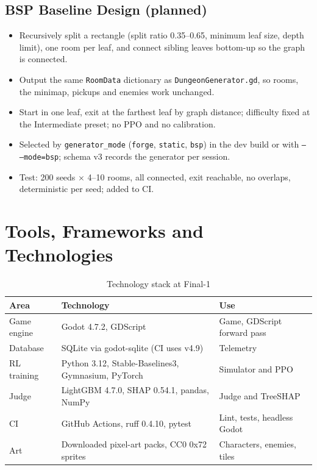 \subsection{BSP Baseline Design (planned)}
\label{sec:bsp_plan}
\begin{itemize}
    \item Recursively split a rectangle (split ratio 0.35--0.65, minimum leaf size, depth limit), one room per leaf, and connect sibling leaves bottom-up so the graph is connected.
    \item Output the same \texttt{RoomData} dictionary as \texttt{DungeonGenerator.gd}, so rooms, the minimap, pickups and enemies work unchanged.
    \item Start in one leaf, exit at the farthest leaf by graph distance; difficulty fixed at the Intermediate preset; no PPO and no calibration.
    \item Selected by \texttt{generator\_mode} (\texttt{forge}, \texttt{static}, \texttt{bsp}) in the dev build or with \texttt{-- --mode=bsp}; schema v3 records the generator per session.
    \item Test: 200 seeds $\times$ 4--10 rooms, all connected, exit reachable, no overlaps, deterministic per seed; added to CI.
\end{itemize}

\section{Tools, Frameworks and Technologies}
\begin{table}[!htbp]
\centering
\caption{Technology stack at Final-1}
\label{tab:tech_stack3}
\small
\begin{tabular}{p{}p{}p{}}
\toprule
\textbf{Area} & \textbf{Technology} & \textbf{Use} \\
\midrule
Game engine & Godot 4.7.2, GDScript & Game, GDScript forward pass \\
Database & SQLite via godot-sqlite (CI uses v4.9) & Telemetry \\
RL training & Python 3.12, Stable-Baselines3, Gymnasium, PyTorch & Simulator and PPO \\
Judge & LightGBM 4.7.0, SHAP 0.54.1, pandas, NumPy & Judge and TreeSHAP \\
CI & GitHub Actions, ruff 0.4.10, pytest & Lint, tests, headless Godot \\
Art & Downloaded pixel-art packs, CC0 0x72 sprites & Characters, enemies, tiles \\
\bottomrule
\end{tabular}
\end{table}


